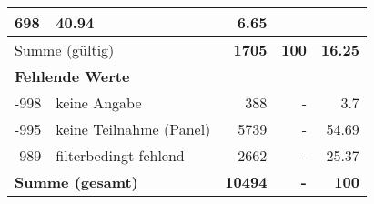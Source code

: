 \begin{longtable}{lXrrr}
       \num{698} &
       \num[round-mode=places,round-precision=2]{40,94} &
         \num[round-mode=places,round-precision=2]{6,65} \\
     \midrule
     \multicolumn{2}{l}{Summe (gültig)} &
       \textbf{\num{1705}} &
     \textbf{100} &
       \textbf{\num[round-mode=places,round-precision=2]{16,25}} \\
     \multicolumn{5}{l}{\textbf{Fehlende Werte}}\\
       -998 &
       keine Angabe &
         \num{388} &
        - &
         \num[round-mode=places,round-precision=2]{3,7} \\
       -995 &
       keine Teilnahme (Panel) &
         \num{5739} &
        - &
         \num[round-mode=places,round-precision=2]{54,69} \\
       -989 &
       filterbedingt fehlend &
         \num{2662} &
        - &
         \num[round-mode=places,round-precision=2]{25,37} \\
     \midrule
     \multicolumn{2}{l}{\textbf{Summe (gesamt)}} &
          \textbf{\num{10494}} &
        \textbf{-} &
        \textbf{100} \\
     \bottomrule
     \end{longtable}
     
